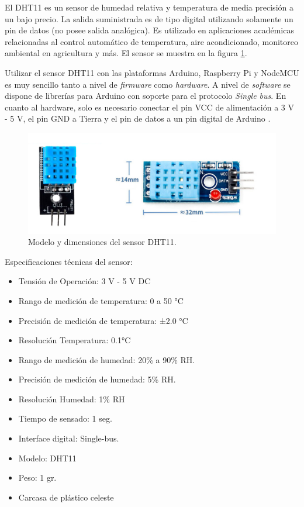 El DHT11 es un sensor de humedad relativa y temperatura de media precisión a un bajo precio. La salida suministrada es de tipo digital utilizando solamente un pin de datos (no posee salida analógica). Es utilizado en aplicaciones académicas relacionadas al control automático de temperatura, aire acondicionado, monitoreo ambiental en agricultura y más. El sensor se muestra en la figura \ref{fig:dht11}.

Utilizar el sensor DHT11 con las plataformas Arduino, Raspberry Pi y NodeMCU es muy sencillo tanto a nivel de \emph{firmware} como \emph{hardware}. A nivel de \emph{software} se dispone de librerías para Arduino con soporte para el protocolo \emph{Single bus}. En cuanto al hardware, solo es necesario conectar el pin VCC de alimentación a 3 V - 5 V, el pin GND a Tierra y el pin de datos a un pin digital de Arduino \citep{WEBSITE:8}. 

\begin{figure}[htbp]
	\centering
	\includegraphics[width=.8\textwidth]{./Figures/dht11.jpg}
	\caption{Modelo y dimensiones del sensor DHT11. }

	\label{fig:dht11}
\end{figure}

Especificaciones técnicas del sensor:

\begin{itemize}
\item Tensión de Operación: 3 V - 5 V DC
\item Rango de medición de temperatura: 0 a 50 °C
\item Precisión de medición de temperatura: ±2.0 °C
\item Resolución Temperatura: 0.1°C
\item Rango de medición de humedad: 20\% a 90\% RH.
\item Precisión de medición de humedad: 5\% RH.
\item Resolución Humedad: 1\% RH
\item Tiempo de sensado: 1 seg.
\item Interface digital: Single-bus.
\item Modelo: DHT11
\item Peso: 1 gr.
\item Carcasa de plástico celeste
\end{itemize}

